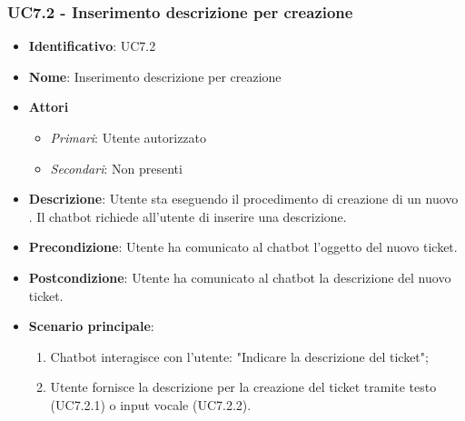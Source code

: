 \subsubsection{UC7.2 - Inserimento descrizione per creazione }
\begin{itemize}
	\item \textbf{Identificativo}: UC7.2
	\item \textbf{Nome}: Inserimento descrizione per creazione  
	\item \textbf{Attori}
	\begin{itemize} 
		\item \textit{Primari}: Utente autorizzato
		\item \textit{Secondari}: Non presenti
	\end{itemize}
	\item \textbf{Descrizione}:  Utente sta eseguendo il procedimento di creazione di un nuovo . Il chatbot richiede all'utente di inserire una descrizione. 
	\item \textbf{Precondizione}: Utente ha comunicato al chatbot l'oggetto del nuovo ticket.
	\item \textbf{Postcondizione}: Utente ha comunicato al chatbot la descrizione del nuovo ticket.
	\item \textbf{Scenario principale}: \begin{enumerate}
		\item Chatbot interagisce con l'utente: "Indicare la descrizione del ticket";
		\item Utente fornisce la descrizione per la creazione del ticket tramite testo (UC7.2.1) o input vocale (UC7.2.2).
	\end{enumerate}
	\end{itemize}

